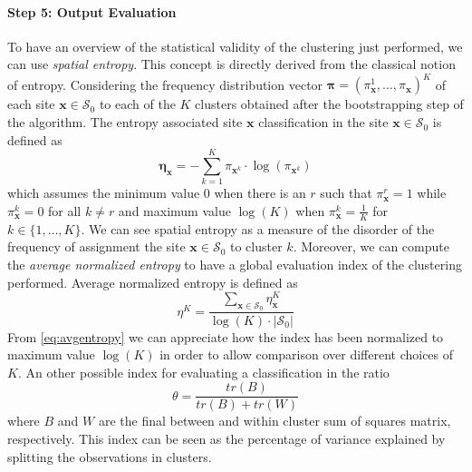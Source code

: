 \paragraph{Step 5: Output Evaluation} To have an overview of the statistical validity of the clustering just performed, we can use \textit{spatial entropy}. This concept is directly derived from the classical notion of entropy. Considering the frequency distribution vector $\boldsymbol{\pi}=(\pi_{\mathbf{x}}^1,\dots,\pi_{\mathbf{x}})^K$ of each site $\mathbf{x} \in \mathcal{S}_0$ to each of the $K$ clusters obtained after the bootstrapping step of the algorithm. The entropy associated site $\mathbf{x}$ classification in the site $\mathbf{x}\in\mathcal{S}_0$ is defined as
\begin{equation}
\mathbf{\eta}_{\mathbf{x}}=-\sum_{k=1}^K\pi_{\mathbf{x}^k}\cdot \log(\pi_{\mathbf{x}^k})
\end{equation}
which assumes the minimum value 0 when there is an $r$ such that $\pi_{\mathbf{x}}^r=1$ while $\pi_{\mathbf{x}}^k=0$ for all $k\neq r$ and maximum value $\log(K)$ when $\pi_{\mathbf{x}}^k=\frac{1}{K}$ for $k\in\{1,\dots,K\}$. We can see spatial entropy as a measure of the disorder of the frequency of assignment the site $\mathbf{x}\in\mathcal{S}_0$ to cluster $k$. Moreover, we can compute the \textit{average normalized entropy} to have a global evaluation index of the clustering performed. Average normalized entropy is defined as
\begin{equation}
\label{eq:avgentropy}
    \eta^K=\frac{\sum_{\textbf{x}\in\mathcal{S}_0}\eta_{\mathbf{x}}^K}{\log(K)\cdot |\mathcal{S}_0|}
\end{equation}
From \ref{eq:avgentropy} we can appreciate how the index has been normalized to maximum value $\log(K)$ in order to allow comparison over different choices of $K$. An other possible index for evaluating a classification in the ratio
\begin{equation}
    \label{eq:theta}
    \theta=\frac{tr(B)}{tr(B)+tr(W)}
\end{equation}
where $B$ and $W$ are the final between and within cluster sum of squares matrix, respectively. This index can be seen as the percentage of variance explained by splitting the observations in clusters.


